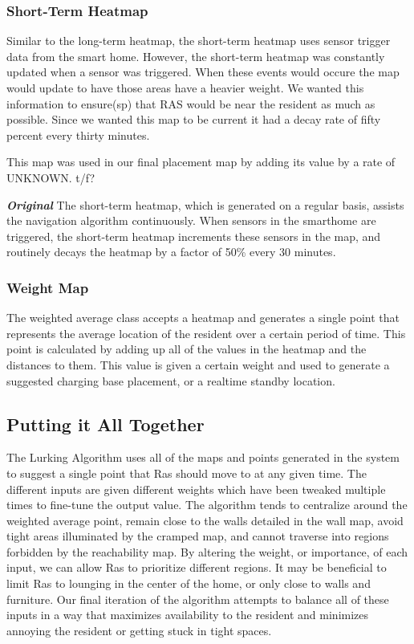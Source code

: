 \documentclass[11pt, conference, a4paper]{IEEEtran}
\begin{document}
\subsubsection{Short-Term Heatmap}
Similar to the long-term heatmap, the short-term heatmap uses sensor trigger data from the smart home. However, the short-term heatmap was constantly updated when a sensor was triggered. When these events would occure the map would update to have those areas have a heavier weight. We wanted this information to ensure(sp) that RAS would be near the resident as much as possible. Since we wanted this map to be current it had a decay rate of fifty percent every thirty minutes. 

This map was used in our final placement map by adding its value by a rate of UNKNOWN. t/f?


\textit{\textbf{Original}} The short-term heatmap, which is generated on a regular basis, assists the navigation algorithm continuously. When sensors in the smarthome are triggered, the short-term heatmap increments these sensors in the map, and routinely decays the heatmap by a factor of 50\% every 30 minutes. 


\subsubsection{Weight Map}
The weighted average class accepts a heatmap and generates a single point that represents the average location of the resident over a certain period of time. This point is calculated by adding up all of the values in the heatmap and the distances to them. This value is given a certain weight and used to generate a suggested charging base placement, or a realtime standby location.


\subsection{Putting it All Together}
The Lurking Algorithm uses all of the maps and points generated in the system to suggest a single point that Ras should move to at any given time. The different inputs are given different weights which have been tweaked multiple times to fine-tune the output value. The algorithm tends to centralize around the weighted average point, remain close to the walls detailed in the wall map, avoid tight areas illuminated by the cramped map, and cannot traverse into regions forbidden by the reachability map. By altering the weight, or importance, of each input, we can allow Ras to prioritize different regions. It may be beneficial to limit Ras to lounging in the center of the home, or only close to walls and furniture. Our final iteration of the algorithm attempts to balance all of these inputs in a way that maximizes availability to the resident and minimizes annoying the resident or getting stuck in tight spaces. 
\end{document}
